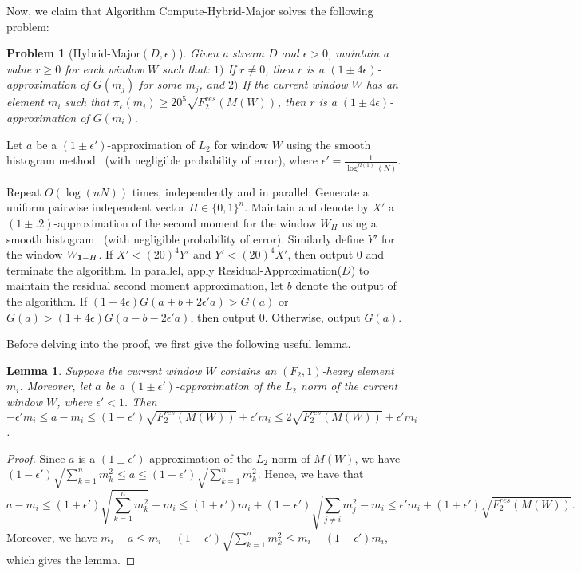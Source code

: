 \documentclass[11pt]{article}
\newtheorem{lem}{Lemma}
\newtheorem{prob}{Problem}
\newcommand{\one}{{\bf 1}}
\begin{document}
Now, we claim that Algorithm Compute-Hybrid-Major solves the following problem:
\begin{prob}[Hybrid-Major$(D,\epsilon)$]
Given a stream $D$ and $\epsilon > 0$, maintain a value $r \geq 0$ for each window $W$ such
that:
$1)$ If $r\neq 0$, then $r$ is a $(1\pm 4\epsilon)$-approximation of $G(m_j)$ for some $m_j$, and
$2)$ If the current window $W$ has an element $m_i$ such that
$\pi_{\epsilon}(m_i) \ge 20^5\sqrt{F^{res}_2(M(W))}$, then $r$ is a $(1\pm 4\epsilon)$-approximation of $G(m_i)$.
\end{prob}

\begin{algorithm}\label{alg:heavyapprox}
\DontPrintSemicolon
Let $a$ be a $(1 \pm \epsilon')$-approximation of $L_2$ for window $W$ using the smooth histogram
method~\cite{BO07} (with negligible probability of error), where $\epsilon' = \frac{1}{\log^{\Omega(1)}(N)}$. \;

Repeat $O(\log(nN))$ times, independently and in parallel: \;
\Indp
Generate a uniform pairwise independent vector $H \in \{0,1\}^n$. \;
Maintain and denote by $X'$ a $(1 \pm .2)$-approximation of the second moment for the window $W_H$ using
a smooth histogram~\cite{BO07} (with negligible probability of error). \;
Similarly define $Y'$ for the window $W_{\one-H}$. \;
If $X' < {(20)^4} Y'$ and $Y' < {(20)^4} X'$, then output $0$ and terminate the algorithm. \;
\Indm
In parallel, apply Residual-Approximation($D$) to maintain the residual second moment approximation,
let $b$ denote the output of the algorithm. \;
If $(1-4\epsilon)G(a + b + 2 \epsilon' a) > G(a)$ or $G(a) > (1+4\epsilon)G(a - b - 2 \epsilon' a)$, then output $0$. \;
Otherwise, output $G(a)$. \;
\caption{Compute-Hybrid-Major$(D, \epsilon)$}
\end{algorithm}

Before delving into the proof, we first give the following useful lemma.

\begin{lem}\label{lem:heavyapprox}
Suppose the current window $W$ contains an $(F_2,1)$-heavy element $m_i$.
Moreover, let $a$ be a $(1 \pm \epsilon')$-approximation of the $L_2$ norm of the current window $W$, where $\epsilon' < 1$.
Then $-\epsilon' m_i \leq a - m_i \leq (1 + \epsilon')\sqrt{F^{res}_2(M(W))} + \epsilon' m_i \leq 2\sqrt{F^{res}_2(M(W))} + \epsilon' m_i$.
\end{lem}
\begin{proof}
Since $a$ is a $(1 \pm \epsilon')$-approximation of the $L_2$ norm of $M(W)$, we have
$(1-\epsilon')\sqrt{\sum_{k=1}^nm_k^2} \leq a \leq (1+\epsilon')\sqrt{\sum_{k=1}^nm_k^2}$.
Hence, we have that
$$
a - m_i \leq (1+\epsilon')\sqrt{\sum_{k=1}^n m_k^2} - m_i \leq (1+\epsilon')m_i + (1+\epsilon')\sqrt{\sum_{j \neq i}m_j^2} - m_i \leq \epsilon' m_i + (1+\epsilon')\sqrt{F_2^{res}(M(W))}.
$$
Moreover, we have $m_i - a \leq m_i - (1-\epsilon')\sqrt{\sum_{k=1}^n m_k^2} \leq m_i - (1-\epsilon')m_i$,
which gives the lemma.
\end{proof}
\end{document}
